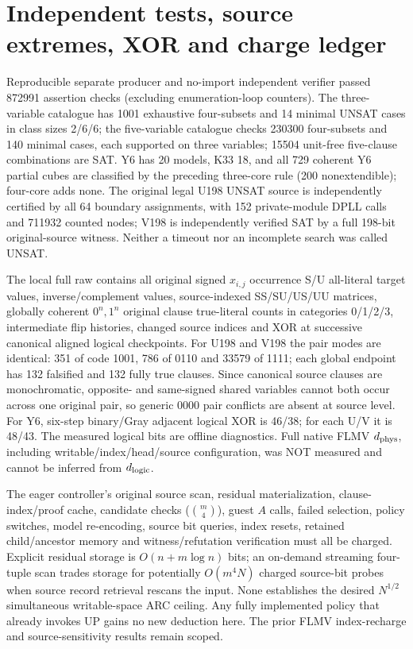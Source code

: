 \documentclass[11pt]{article}
\begin{document}
\section{Independent tests, source extremes, XOR and charge ledger}
Reproducible separate producer and no-import independent verifier passed 872991 assertion checks (excluding enumeration-loop counters). The three-variable catalogue has 1001 exhaustive four-subsets and 14 minimal UNSAT cases in class sizes 2/6/6; the five-variable catalogue checks 230300 four-subsets and 140 minimal cases, each supported on three variables; 15504 unit-free five-clause combinations are SAT. Y6 has 20 models, K33 18, and all 729 coherent Y6 partial cubes are classified by the preceding three-core rule (200 nonextendible); four-core adds none. The original legal U198 UNSAT source is independently certified by all 64 boundary assignments, with 152 private-module DPLL calls and 711932 counted nodes; V198 is independently verified SAT by a full 198-bit original-source witness. Neither a timeout nor an incomplete search was called UNSAT.

The local full raw contains all original signed $x_{i,j}$ occurrence S/U all-literal target values, inverse/complement values, source-indexed SS/SU/US/UU matrices, globally coherent $0^n,1^n$ original clause true-literal counts in categories 0/1/2/3, intermediate flip histories, changed source indices and XOR at successive canonical aligned logical checkpoints. For U198 and V198 the pair modes are identical: 351 of code 1001, 786 of 0110 and 33579 of 1111; each global endpoint has 132 falsified and 132 fully true clauses. Since canonical source clauses are monochromatic, opposite- and same-signed shared variables cannot both occur across one original pair, so generic 0000 pair conflicts are absent at source level. For Y6, six-step binary/Gray adjacent logical XOR is 46/38; for each U/V it is 48/43. The measured logical bits are offline diagnostics. Full native FLMV $d_{\rm phys}$, including writable/index/head/source configuration, was NOT measured and cannot be inferred from $d_{\rm logic}$.

The eager controller's original source scan, residual materialization, clause-index/proof cache, candidate checks ($\binom m4$), guest $A$ calls, failed selection, policy switches, model re-encoding, source bit queries, index resets, retained child/ancestor memory and witness/refutation verification must all be charged. Explicit residual storage is $O(n+m\log n)$ bits; an on-demand streaming four-tuple scan trades storage for potentially $O(m^4N)$ charged source-bit probes when source record retrieval rescans the input. None establishes the desired $N^{1/2}$ simultaneous writable-space ARC ceiling. Any fully implemented policy that already invokes UP gains no new deduction here. The prior FLMV index-recharge and source-sensitivity results remain scoped.
\end{document}
